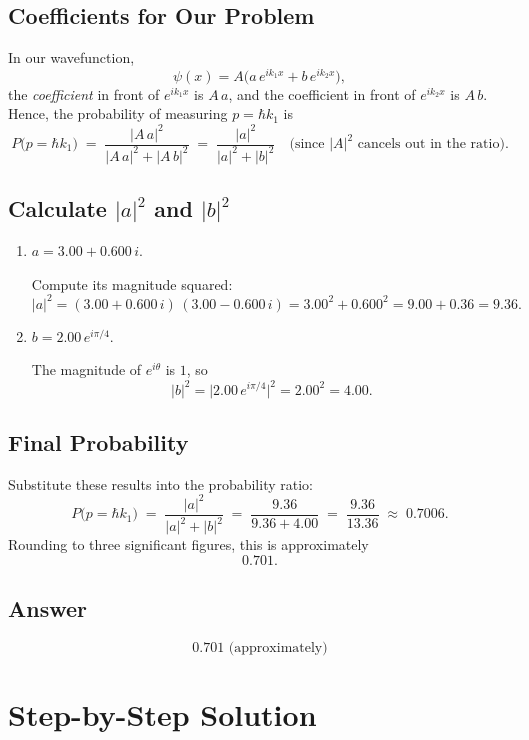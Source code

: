 \documentclass[12pt]{article}
\theoremstyle{definition} %
\theoremstyle{plain} %
\begin{document}
\subsection*{Coefficients for Our Problem}
In our wavefunction,
\[
\psi(x) = A\bigl(a\,e^{i k_1 x} + b\,e^{i k_2 x}\bigr),
\]
the \emph{coefficient} in front of \(e^{i k_1 x}\) is \(A\,a\), and the coefficient in front of \(e^{i k_2 x}\) is \(A\,b\). 
Hence, the probability of measuring \(p = \hbar k_1\) is
\[
P\bigl(p = \hbar k_1\bigr)
\;=\;
\frac{\bigl|A\,a\bigr|^2}{\bigl|A\,a\bigr|^2 + \bigl|A\,b\bigr|^2}
\;=\;
\frac{|a|^2}{|a|^2 + |b|^2}
\quad
\bigl(\text{since }|A|^2\text{ cancels out in the ratio}\bigr).
\]

\subsection*{Calculate \(\lvert a\rvert^2\) and \(\lvert b\rvert^2\)}
\begin{enumerate}
\item \(\displaystyle a = 3.00 + 0.600\,i\).

Compute its magnitude squared:
\[
|a|^2 
= (3.00 + 0.600\,i)\,(3.00 - 0.600\,i)
= 3.00^2 + 0.600^2
= 9.00 + 0.36
= 9.36.
\]

\item \(\displaystyle b = 2.00\,e^{i\pi/4}\).

The magnitude of \(e^{i\theta}\) is \(1\), so
\[
|b|^2 
= \bigl|2.00\,e^{i\pi/4}\bigr|^2
= 2.00^2
= 4.00.
\]
\end{enumerate}

\subsection*{Final Probability}
Substitute these results into the probability ratio:
\[
P\bigl(p = \hbar k_1\bigr)
\;=\;
\frac{|a|^2}{|a|^2 + |b|^2}
\;=\;
\frac{9.36}{9.36 + 4.00}
\;=\;
\frac{9.36}{13.36}
\;\approx\; 0.7006.
\]
Rounding to three significant figures, this is approximately
\[
0.701.
\]

\subsection*{Answer}
\[
\boxed{0.701 \text{ (approximately)}}
\]

\section*{Step-by-Step Solution}
\end{document}
